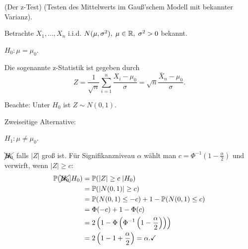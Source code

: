 \documentclass{tstextbook}
\begin{document}
\begin{example}(Der z-Test)
	(Testen des Mittelwerts im Gauß'schem Modell mit bekannter Varianz). 
	
	Betrachte $ X_1,\ldots,X_n $ i.i.d. $ N(\mu,\sigma^2), \; \mu\in\mathbb R, \;\sigma^2>0 $ bekannt. 
	
	$ H_0\colon \mu=\mu_0 $. 
	
	Die sogenannte z-Statistik ist gegeben durch 
	\[
	Z = \frac{1}{\sqrt{n}}\sum_{i=1}^{n}\frac{X_i-\mu_0}{\sigma} = \sqrt{n}\frac{\bar{X}_n-\mu_0}{\sigma}.
	\]
	
	Beachte: Unter $ H_0 $ ist $ Z\sim N(0,1) $. 
	
	Zweiseitige Alternative: 
	
	$ H_1\colon \mu\ne\mu_0 $.
	
	$ \xcancel{H_0} $ falls $ |Z| $ groß ist. Für Signifikanzniveau $ \alpha $ wählt man $ c=\Phi^{-1}\left(1-\frac{\alpha}{2}\right) $ und verwirft, wenn $ |Z|\ge c $: 
	\[
	\begin{aligned}
		\mathbb P(\xcancel{H_0}|H_0) & = \mathbb P(|Z|\ge c\;|H_0) \\
		& = \mathbb P(|N(0,1)|\ge c) \\
		& = \mathbb P(N(0,1)\le -c)+1-\mathbb P(N(0,1)\le c) \\
		& = \Phi(-c)+1-\Phi(c) \\
		& = 2\left(1-\Phi\left(\Phi^{-1}\left(1-\frac{\alpha}{2}\right)\right)\right) \\
		& = 2\left(1-1+\frac{\alpha}{2}\right) = \alpha. \checkmark
	\end{aligned}
	\]
	
		\begin{center}
	\end{center}
	

\end{example}
\end{document}
